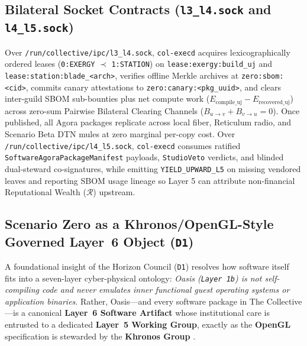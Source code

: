 \subsection{Bilateral Socket Contracts (\texttt{l3\_l4.sock} and \texttt{l4\_l5.sock})}

Over \texttt{/run/collective/ipc/l3\_l4.sock}, \texttt{col-execd} acquires lexicographically ordered leases
(\texttt{0:EXERGY} $\prec$ \texttt{1:STATION}) on \texttt{lease:exergy:build\_uj} and
\texttt{lease:station:blade\_<arch>}, verifies offline Merkle archives at \texttt{zero:sbom:<cid>}, commits canary
attestations to \texttt{zero:canary:<pkg\_uuid>}, and clears inter-guild SBOM sub-bounties plus net compute work
($E_{\mathrm{compile\_uj}} - E_{\mathrm{recovered\_uj}}$) across zero-sum Pairwise Bilateral Clearing Channels
($B_{u\to v} + B_{v\to u} = 0$). Once published, all Agora packages replicate across local fiber, Reticulum radio, and
Scenario Beta DTN mules at zero marginal per-copy cost. Over \texttt{/run/collective/ipc/l4\_l5.sock},
\texttt{col-execd} consumes ratified \texttt{SoftwareAgoraPackageManifest} payloads, \texttt{StudioVeto} verdicts, and
blinded dual-steward co-signatures, while emitting \texttt{YIELD\_UPWARD\_L5} on missing vendored leaves and reporting
SBOM usage lineage so Layer 5 can attribute non-financial Reputational Wealth ($\mathcal{R}$) upstream.

\subsection{Scenario Zero as a Khronos/OpenGL-Style Governed Layer~6 Object (\texttt{D1})}
\label{sec:zero-khronos-lifecycle}

A foundational insight of the Horizon Council (\texttt{D1}) resolves how software itself fits into a seven-layer
cyber-physical ontology: \emph{Oasis (\texttt{Layer 1b}) is not self-compiling code and never emulates inner functional
guest operating systems or application binaries}. Rather, Oasis---and every software package in The Collective---is a
canonical \textbf{Layer~6 Software Artifact} whose institutional care is entrusted to a dedicated \textbf{Layer~5
Working Group}, exactly as the \textbf{OpenGL} specification is stewarded by the \textbf{Khronos Group}
\parencite{ostrom1990,w3c2020jsonld}.

